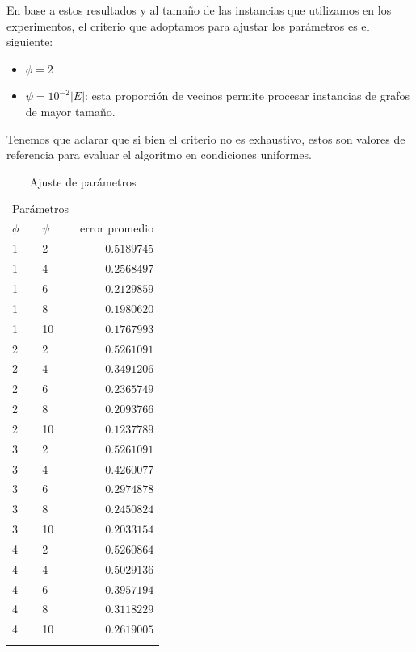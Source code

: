 \documentclass[conference,compsoc,a4paper]{IEEEtran}
\begin{document}
\smallskip

En base a estos resultados y al tamaño de las instancias que utilizamos 
en los experimentos, el criterio que adoptamos para ajustar los 
parámetros es el siguiente:

\begin{itemize}
	\item $\phi = 2$
	\item $\psi = 10^{-2} |E|$: esta proporción de vecinos permite 
	procesar instancias de grafos de mayor tamaño.
\end{itemize}

Tenemos que aclarar que si bien el criterio no es exhaustivo, estos son 
valores de referencia para evaluar el algoritmo en condiciones 
uniformes.

\begin{table}
	\caption{Ajuste de parámetros}
	\centering
	\begin{tabular}{llr}
		\toprule
		\multicolumn{2}{c}{Parámetros} \\
		\cmidrule(r){1-2}
		$\phi$ & $\psi$ & error promedio \\
		\midrule
		1 & 2 & $0.5189745$ \\
		1 & 4 & $0.2568497$ \\
		1 & 6 & $0.2129859$ \\
		1 & 8 & $0.1980620$ \\
		1 & 10 & $0.1767993$ \\
		2 & 2 & $0.5261091$ \\
		2 & 4 & $0.3491206$ \\
		2 & 6 & $0.2365749$ \\
		2 & 8 & $0.2093766$ \\
		2 & 10 & $0.1237789$ \\
		3 & 2 & $0.5261091$ \\
		3 & 4 & $0.4260077$ \\
		3 & 6 & $0.2974878$ \\
		3 & 8 & $0.2450824$ \\
		3 & 10 & $0.2033154$ \\
		4 & 2 & $0.5260864$ \\
		4 & 4 & $0.5029136$ \\
		4 & 6 & $0.3957194$ \\
		4 & 8 & $0.3118229$ \\
		4 & 10 & $0.2619005$ \\
		\bottomrule
		\label{tab:ajuste1}
	\end{tabular}
\end{table}
\end{document}
